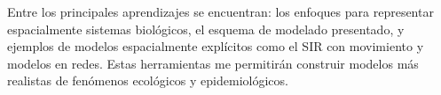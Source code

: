 \documentclass[fleqn,10pt]{SelfArx_063318} %
\begin{document}
Entre los principales aprendizajes se encuentran: los enfoques para representar espacialmente sistemas biológicos,
el esquema de modelado presentado, y ejemplos de modelos espacialmente explícitos como el SIR con movimiento y
modelos en redes. Estas herramientas me permitirán construir modelos más realistas de fenómenos ecológicos y
epidemiológicos.















\end{document}
